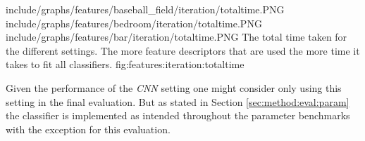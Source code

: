 \tripfigure
{include/graphs/features/baseball_field/iteration/totaltime.PNG}
{include/graphs/features/bedroom/iteration/totaltime.PNG}
{include/graphs/features/bar/iteration/totaltime.PNG}
{The total time taken for the different settings. The more feature descriptors that are used the more time it takes to fit all classifiers.}
{fig:features:iteration:totaltime}

Given the performance of the \emph{CNN} setting one might consider only using this setting in the final evaluation. But as stated in Section \ref{sec:method:eval:param} the classifier is implemented as intended throughout the parameter benchmarks with the exception for this evaluation. 

